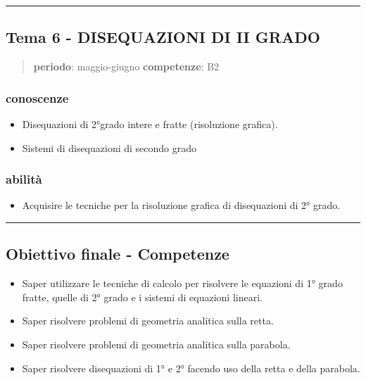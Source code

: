 \documentclass[12pt, a4paper]{exam}
\begin{document}
\bigskip
\hrule
\bigskip

\subsection*{Tema 6 - DISEQUAZIONI DI II GRADO}

\begin{quote}
\textbf{periodo}: maggio-giugno \textbf{competenze}: B2
\end{quote}

\subsubsection*{conoscenze}

\begin{itemize}
\item
  Disequazioni di 2°grado intere e fratte (risoluzione grafica).
\item
  Sistemi di disequazioni di secondo grado
\end{itemize}


\subsubsection*{abilità}

\begin{itemize}
\item
  Acquisire le tecniche per la risoluzione grafica di disequazioni di 2°
  grado.
\end{itemize}

\bigskip
\hrule
\bigskip

\subsection*{Obiettivo finale - Competenze}

\begin{itemize}
  \item Saper utilizzare le tecniche di calcolo per risolvere le equazioni di 1° grado fratte,  quelle di 2° grado e i sistemi di equazioni lineari.
  \item Saper risolvere problemi di geometria analitica sulla retta.
  \item Saper risolvere problemi di geometria analitica sulla  parabola.
  \item Saper risolvere disequazioni di 1° e 2°  facendo uso della retta e della parabola.
\end{itemize}
\end{document}
